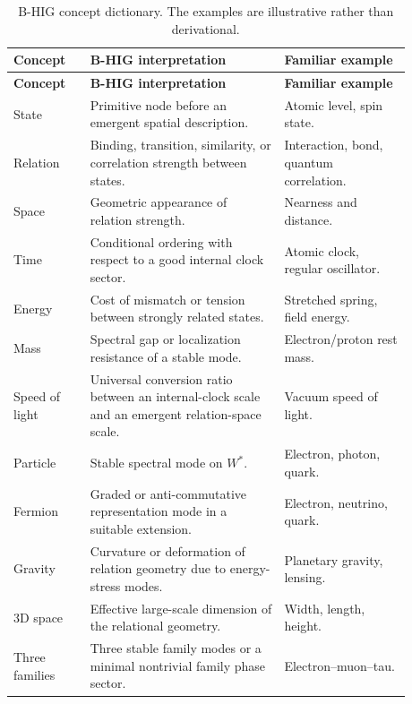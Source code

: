 \documentclass[11pt,a4paper]{article}
\newcommand{\Wstar}{W^{\ast}}
\begin{document}
\begin{longtable}{p{0.17\linewidth}p{0.43\linewidth}p{0.28\linewidth}}
\caption{B-HIG concept dictionary. The examples are illustrative rather than derivational.}\label{tab:dictionary}\\
\toprule
\textbf{Concept} & \textbf{B-HIG interpretation} & \textbf{Familiar example}\\
\midrule
\endfirsthead
\toprule
\textbf{Concept} & \textbf{B-HIG interpretation} & \textbf{Familiar example}\\
\midrule
\endhead
State & Primitive node before an emergent spatial description. & Atomic level, spin state.\\
Relation & Binding, transition, similarity, or correlation strength between states. & Interaction, bond, quantum correlation.\\
Space & Geometric appearance of relation strength. & Nearness and distance.\\
Time & Conditional ordering with respect to a good internal clock sector. & Atomic clock, regular oscillator.\\
Energy & Cost of mismatch or tension between strongly related states. & Stretched spring, field energy.\\
Mass & Spectral gap or localization resistance of a stable mode. & Electron/proton rest mass.\\
Speed of light & Universal conversion ratio between an internal-clock scale and an emergent relation-space scale. & Vacuum speed of light.\\
Particle & Stable spectral mode on $\Wstar$. & Electron, photon, quark.\\
Fermion & Graded or anti-commutative representation mode in a suitable extension. & Electron, neutrino, quark.\\
Gravity & Curvature or deformation of relation geometry due to energy-stress modes. & Planetary gravity, lensing.\\
3D space & Effective large-scale dimension of the relational geometry. & Width, length, height.\\
Three families & Three stable family modes or a minimal nontrivial family phase sector. & Electron--muon--tau.\\
\bottomrule
\end{longtable}
\end{document}
